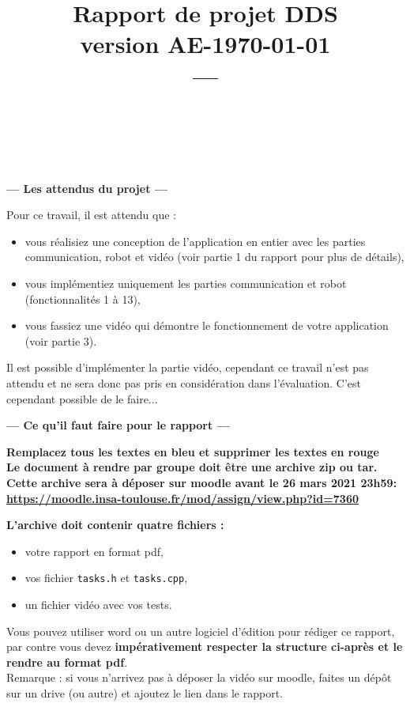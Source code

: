 \documentclass[11pt, a4paper]{paper}
\title{{\Huge Rapport de projet DDS}\\
{\large version AE-\today}\\
---\\
}
\author{\color{blue}{Mettez ici vos noms et les parties sur lesquelles vous avez travaillées :}\\
\color{blue}{conception, robot, vidéo, mission, intégration, rédaction du compte-rendu}\\
\color{blue}{Exemple : P.-E. Hladik (conception, robot, rédaction du compte-rendu)}
}
\begin{document}
\maketitle


{\color{red}
\begin{framed}
\begin{center}{\bf\Large --- Les attendus du projet --- } \end{center}

Pour ce travail, il est attendu que :
\begin{itemize}
	\item vous réalisiez une conception de l'application en entier avec les parties communication, robot et vidéo (voir partie 1 du rapport pour plus de détails),
	\item vous implémentiez uniquement les parties communication et robot (fonctionnalités 1 à 13),
	\item vous fassiez une vidéo qui démontre le fonctionnement de votre application (voir partie 3).
\end{itemize}

Il est possible d'implémenter la partie vidéo, cependant ce travail n'est pas attendu et ne sera donc pas pris en considération dans l'évaluation. C'est cependant possible de le faire...

\begin{center}{\bf\Large --- Ce qu'il faut faire pour le rapport --- } \end{center}

{\bf Remplacez tous les textes en bleu et supprimer les textes en rouge}\\

{\bf Le document à rendre par groupe doit être une archive zip ou tar. Cette archive sera
 à déposer sur moodle avant le 26 mars 2021 23h59:
\url{https://moodle.insa-toulouse.fr/mod/assign/view.php?id=7360}}\\


{\bf L'archive doit contenir quatre fichiers :
\begin{itemize}
	\item votre rapport en format pdf, 
	\item vos fichier {\tt tasks.h} et  {\tt tasks.cpp},
	\item un fichier vidéo avec vos tests.\\
\end{itemize}}

Vous pouvez utiliser word ou un autre logiciel d'édition pour rédiger ce rapport, par contre vous devez  {\bf impérativement respecter la structure ci-après et le rendre au format pdf}.\\
Remarque : si vous n'arrivez pas à déposer la vidéo sur moodle, faites un dépôt sur un drive (ou autre) et ajoutez le lien dans le rapport.\\
\\


\end{framed}}
\end{document}
